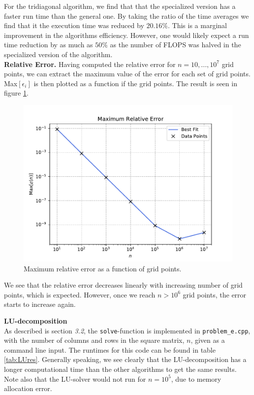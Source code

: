\documentclass[a4paper,10pt]{article}
\begin{document}
For the tridiagonal algorithm, we find that that the specialized version has a faster run time than the general one. By taking the ratio of the time averages we find that it the execution time was reduced by $20.16\%$. This is a marginal improvement in the algorithms efficiency. However, one would likely expect a run time reduction by as much as $50\%$ as the number of FLOPS was halved in the specialized version of the algorithm. \\

 \textbf{Relative Error.}
Having computed the relative error for $n = 10, ..., 10^7$ grid points, we can extract the maximum value of the error for each set of grid points. Max$[\epsilon_i]$ is then plotted as a function if the grid points. The result is seen in figure \ref{fig:4}.

\begin{figure}[h]
  \centering
  \includegraphics[width=0.9\linewidth]{figures/rel_error_plot.pdf}
  \caption{Maximum relative error as a function of grid points.}
  \label{fig:4}
\end{figure}

We see that the relative error decreases linearly with increasing number of grid points, which is expected. However, once we reach $n > 10^6$ grid points, the error starts to increase again. 

\bigskip
{} \textbf{LU-decomposition} \\
As described is section \textit{3.2}, the \texttt{solve}-function is implemented in \texttt{problem\_e.cpp}, with the number of columns and rows in the square matrix, $n$, given as a command line input. The runtimes for this code can be found in table \ref{tab:LUres}. Generally speaking, we see clearly that the LU-decomposition has a longer computational time than the other algorithms to get the same results. Note also that the LU-solver would not run for $n = 10^5$, due to memory allocation error.
\end{document}
